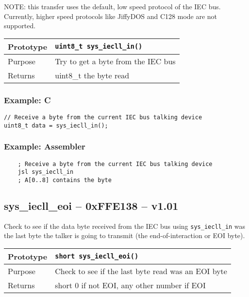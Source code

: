 NOTE: this transfer uses the default, low speed protocol of the IEC bus.
Currently, higher speed protocols like JiffyDOS and C128 mode are not supported.

\bigskip

\begin{table}[!h]\begin{tabular}{|l||l|} \hline
Prototype & \lstinline!uint8_t sys_iecll_in()! \\ \hline
Purpose & Try to get a byte from the IEC bus \\ \hline
Returns & uint8\_t the byte read \\ \hline
\end{tabular}\end{table}

\subsubsection*{Example: C}
\begin{lstlisting}
// Receive a byte from the current IEC bus talking device
uint8_t data = sys_iecll_in();
\end{lstlisting}

\subsubsection*{Example: Assembler}
\begin{verbatim}
    ; Receive a byte from the current IEC bus talking device
    jsl sys_iecll_in
    ; A[0..8] contains the byte
\end{verbatim}


\subsection*{sys\_iecll\_eoi -- 0xFFE138 -- v1.01}
Check to see if the data byte received from the IEC bus using \lstinline|sys_iecll_in| was the
last byte the talker is going to transmit (the end-of-interaction or EOI byte).

\bigskip

\begin{table}[!h]\begin{tabular}{|l||l|} \hline
Prototype & \lstinline!short sys_iecll_eoi()! \\ \hline
Purpose & Check to see if the last byte read was an EOI byte \\ \hline
Returns & short 0 if not EOI, any other number if EOI \\ \hline
\end{tabular}\end{table}

